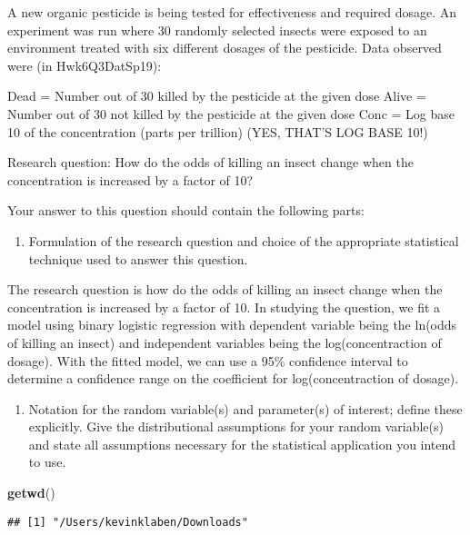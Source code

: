 \documentclass[]{article}
\newenvironment{Shaded}{\begin{snugshade}}{\end{snugshade}}
\newcommand{\KeywordTok}[1]{\textcolor[rgb]{0.13,0.29,0.53}{\textbf{#1}}}
\newcommand{\NormalTok}[1]{#1}
\providecommand{\tightlist}{%
  \setlength{\itemsep}{0pt}\setlength{\parskip}{0pt}}
\begin{document}
A new organic pesticide is being tested for effectiveness and required
dosage. An experiment was run where 30 randomly selected insects were
exposed to an environment treated with six different dosages of the
pesticide. Data observed were (in Hwk6Q3DatSp19):

Dead = Number out of 30 killed by the pesticide at the given dose Alive
= Number out of 30 not killed by the pesticide at the given dose Conc =
Log base 10 of the concentration (parts per trillion) (YES, THAT'S LOG
BASE 10!)

Research question: How do the odds of killing an insect change when the
concentration is increased by a factor of 10?

Your answer to this question should contain the following parts:

\begin{enumerate}
\def\labelenumi{\Alph{enumi})}
\tightlist
\item
  Formulation of the research question and choice of the appropriate
  statistical technique used to answer this question.
\end{enumerate}

The research question is how do the odds of killing an insect change
when the concentration is increased by a factor of 10. In studying the
question, we fit a model using binary logistic regression with dependent
variable being the ln(odds of killing an insect) and independent
variables being the log(concentraction of dosage). With the fitted
model, we can use a 95\% confidence interval to determine a confidence
range on the coefficient for log(concentraction of dosage).

\begin{enumerate}
\def\labelenumi{\Alph{enumi})}
\setcounter{enumi}{1}
\tightlist
\item
  Notation for the random variable(s) and parameter(s) of interest;
  define these explicitly. Give the distributional assumptions for your
  random variable(s) and state all assumptions necessary for the
  statistical application you intend to use.
\end{enumerate}

\begin{Shaded}
\begin{Highlighting}[]
\KeywordTok{getwd}\NormalTok{()}
\end{Highlighting}
\end{Shaded}

\begin{verbatim}
## [1] "/Users/kevinklaben/Downloads"
\end{verbatim}
\end{document}
